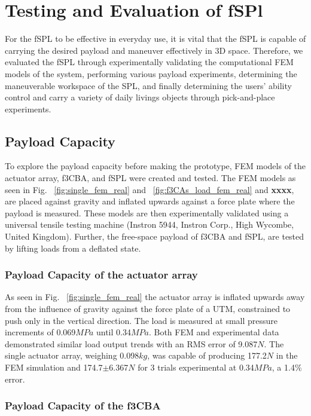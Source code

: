 \documentclass[letterpaper, 10 pt, conference]{ieeeconf}  %
\begin{document}
\section{Testing and Evaluation of fSPl}
For the fSPL to be effective in everyday use, it is vital that the fSPL is capable of carrying the desired payload and maneuver effectively in 3D space. Therefore, we evaluated the fSPL through experimentally validating the computational FEM models of the system, performing various payload experiments, determining the maneuverable workspace of the SPL, and finally determining the users' ability control and carry a variety of daily livings objects through pick-and-place experiments.

\subsection{Payload Capacity}

To explore the payload capacity before making the prototype, FEM models of the actuator array, f3CBA, and fSPL were created and tested. The FEM models as seen in Fig. ~\ref{fig:single_fem_real} and ~\ref{fig:f3CAs_load_fem_real} and \textbf{xxxx}, are placed against gravity and inflated upwards against a force plate where the payload is measured. These models are then experimentally validated using a universal tensile testing machine (Instron 5944, Instron Corp., High Wycombe, United Kingdom). Further, the free-space payload of f3CBA and fSPL, are tested by lifting loads from a deflated state. 

\subsubsection{Payload Capacity of the actuator array}
\label{sec:act_array_fem_real}

As seen in Fig. ~\ref{fig:single_fem_real} the actuator array is inflated upwards away from the influence of gravity against the force plate of a UTM, constrained to push only in the vertical direction. The load is measured at small pressure increments of  0.069$MPa$ until 0.34$MPa$. Both FEM and experimental data demonstrated similar load output trends with an RMS error of 9.087$N$. The single actuator array, weighing 0.098$kg$, was capable of producing 177.2$N$ in the FEM simulation and 174.7$\pm$6.367$N$ for 3 trials experimental at 0.34$MPa$, a 1.4\% error. 


\subsubsection{Payload Capacity of the f3CBA}
\end{document}
